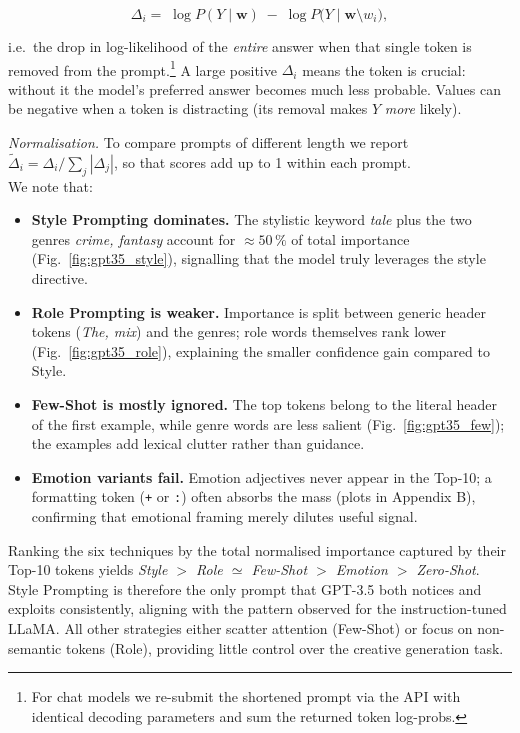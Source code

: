 \documentclass[12pt]{article}
\begin{document}
\[
\Delta_i
=\;
\log P(Y \mid \mathbf{w})
\;-\;
\log P\!\bigl(Y \mid \mathbf{w}\setminus w_i\bigr),
\]

i.e.\ the drop in log-likelihood of the \emph{entire} answer when
that single token is removed from the prompt.\footnote{For chat
models we re-submit the shortened prompt via the API with identical
decoding parameters and sum the returned token log-probs.}  
A large positive $\Delta_i$ means the token is crucial: without it the
model’s preferred answer becomes much less probable.  
Values can be negative when a token is distracting (its removal makes
$Y$ \emph{more} likely).

\emph{Normalisation.}  
To compare prompts of different length we report
$\tilde{\Delta}_i=\Delta_i/\sum_j |\Delta_j|$, so that scores add up to
1 within each prompt. \\

We note that:
\begin{itemize}
  \item \textbf{Style Prompting dominates.}  
        The stylistic keyword \emph{tale} plus the two genres
        \emph{crime, fantasy} account for $\approx50\,\%$ of total
        importance (Fig.~\ref{fig:gpt35_style}), signalling that the
        model truly leverages the style directive.
  \item \textbf{Role Prompting is weaker.}  
        Importance is split between generic header tokens
        (\emph{The, mix}) and the genres; role words themselves rank
        lower (Fig.~\ref{fig:gpt35_role}), explaining the smaller
        confidence gain compared to Style.
  \item \textbf{Few-Shot is mostly ignored.}  
        The top tokens belong to the literal header of the first
        example, while genre words are less salient
        (Fig.~\ref{fig:gpt35_few}); the examples add lexical clutter
        rather than guidance.
  \item \textbf{Emotion variants fail.}  
        Emotion adjectives never appear in the Top-10; a formatting
        token (\texttt{+} or \texttt{:}) often absorbs the mass
        (plots in Appendix B), confirming that emotional framing merely
        dilutes useful signal.
\end{itemize}

Ranking the six techniques by the total normalised importance captured
by their Top-10 tokens yields  
\emph{Style $>$ Role $\simeq$ Few-Shot $>$ Emotion $>$ Zero-Shot}.  
Style Prompting is therefore the only prompt that GPT-3.5 both notices
and exploits consistently, aligning with the pattern observed for the
instruction-tuned LLaMA.  All other
strategies either scatter attention (Few-Shot) or focus on
non-semantic tokens (Role), providing little control over the
creative generation task.
\end{document}
